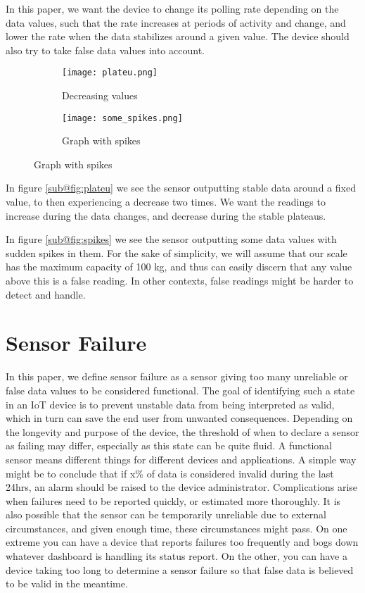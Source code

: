 In this paper, we want the device to change its polling rate depending on the data values, such that the rate increases at periods of activity and change, and lower the rate when the data stabilizes around a given value. The device should also try to take false data values into account.

\begin{figure}[H]
\centering
	\begin{subfigure}[b]{0.3\textwidth}
    \texttt{[image: plateu.png]}
    \caption{Decreasing values}
    \label{fig:plateu}
	\end{subfigure}
	\begin{subfigure}[b]{0.3\textwidth}
    \texttt{[image: some\_spikes.png]}
    \caption{Graph with spikes}
    \label{fig:spikes}
	\end{subfigure}
\end{figure}

In figure \ref{sub@fig:plateu} we see the sensor outputting stable data around a fixed value, to then experiencing a decrease two times. We want the readings to increase during the data changes, and decrease during the stable plateaus.

In figure \ref{sub@fig:spikes} we see the sensor outputting some data values with sudden spikes in them. For the sake of simplicity, we will assume that our scale has the maximum capacity of 100 kg, and thus can easily discern that any value above this is a false reading. In other contexts, false readings might be harder to detect and handle.

\section{Sensor Failure}
In this paper, we define sensor failure as a sensor giving too many unreliable or false data values to be considered functional. The goal of identifying such a state in an IoT device is to prevent unstable data from being interpreted as valid, which in turn can save the end user from unwanted consequences. Depending on the longevity and purpose of the device, the threshold of when to declare a sensor as failing may differ, especially as this state can be quite fluid. A functional sensor means different things for different devices and applications. A simple way might be to conclude that if x\% of data is considered invalid during the last 24hrs, an alarm should be raised to the device administrator. Complications arise when failures need to be reported quickly, or estimated more thoroughly. It is also possible that the sensor can be temporarily unreliable due to external circumstances, and given enough time, these circumstances might pass. On one extreme you can have a device that reports failures too frequently and bogs down whatever dashboard is handling its status report. On the other, you can have a device taking too long to determine a sensor failure so that false data is believed to be valid in the meantime.

